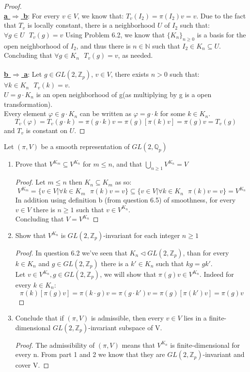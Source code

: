 \documentclass[12pt]{article}
\newenvironment{problem}[2][Problem]{\begin{trivlist}
\item[\hskip \labelsep {\bfseries #1}\hskip \labelsep {\bfseries #2.}]}{\end{trivlist}}
\theoremstyle{definition}
\theoremstyle{lemma}
\theoremstyle{conclusion}
\def\zint{\mathbb{Z}}
\def\zp{\zint_{p}}
\def\qp{\mathbb{Q}_{p}}
\def\gl#1{GL(2, #1)}
\def\glzp{\gl{\zp}}
\def\glqp{\gl{\qp}}
\numberwithin{equation}{section}
\begin{document}
\begin{proof}  \hfill
\\ \underline{\textbf{a $\Rightarrow$ b}}: For every $v \in V$, we know that: $T_v(I_2) = \pi(I_2)v = v$. Due to the fact that $T_v$ is locally constant, there is a neighborhood $U$ of $I_2$ such that: $\forall g \in U \textbf{ } T_v(g) = v$
Using Problem 6.2, we know that $\{K_n\}_{n\geq0}$ is a basis for the open neighborhood of $I_2$, and thus there is $n \in \mathbb{N}$ such that $I_2 \in K_n \subseteq U $. Concluding that $\forall g \in K_n \textbf{ } T_v(g) = v$, as needed.
\\ 
\\ \underline{\textbf{b $\Rightarrow$ a}}: Let $g \in \glzp$, $v \in V$, there exists $n>0$ such that: $\forall k \in K_n \textbf{ } T_v(k) = v$. 
\\ $U = g \cdot K_n$ is an open neighborhood of g(as multiplying by g is a open transformation).
\\ Every element $\varphi \in g \cdot K_n$ can be written as $\varphi = g \cdot k$ for some $k \in K_n$.
$$T_v(\varphi)=T_v(g \cdot k)=\pi(g\cdot k)v = \pi(g)[\pi(k)v]=\pi(g)v=T_v(g)$$ and  $T_v$ is constant on $U$.
\end{proof}

\begin{problem}{6.6}
Let $(\pi, V)$ be a smooth representation of $\glqp$
\end{problem}
\begin{enumerate}
\item Prove that $V^{K_m} \subseteq V^{K_n}$ for $m \leq n$, and that $\bigcup_{n \geq 1} V^{K_n} = V$
\begin{proof}
Let $m \leq n$ then $K_n \subseteq K_m$ as so:
$$ V^{K_m} = \{v \in V | \forall k \in K_m \textbf{ } \pi(k)v=v\} \subseteq \{v \in V | \forall k \in K_n \textbf{ } \pi(k)v=v\} = V^{K_n}$$
In addition using definition b (from question 6.5) of smoothness, for every $v \in V$ there is $n \geq 1$ such that $v \in V^{K_n}$. 
\\Concluding that $V = V^{K_n}$
\end{proof}


\item Show that $V^{K_n}$ is $\glzp$-invariant for each integer $n \geq1$
\begin{proof}
In question 6.2 we've seen that $K_n \lhd \glzp$, than for every $k \in K_n$ and $g \in \glzp$ there is a $k' \in K_n$ such that $kg = gk'$.
\\Let $v \in V^{K_n}, g \in \glzp$, we will show that $\pi(g)v \in V^{K_n}$. Indeed for every $k \in K_n$: 
$$ \pi(k)[\pi(g)v] = \pi(k \cdot g) v = \pi(g \cdot k')v = \pi(g) [\pi(k')v] = \pi(g)v$$ 
\end{proof}
\item Conclude that if $(\pi, V)$ is admissible, then every $v \in V$ lies in a finite-dimensional $\glzp$-invariant subspace of V.
\begin{proof}
The admissibility of $(\pi, V)$ means that $V^{K_n}$ is finite-dimensional for every n. From part 1 and 2 we know that they are $\glzp$-invariant and cover V. 
\end{proof}
\end{enumerate}
\end{document}
